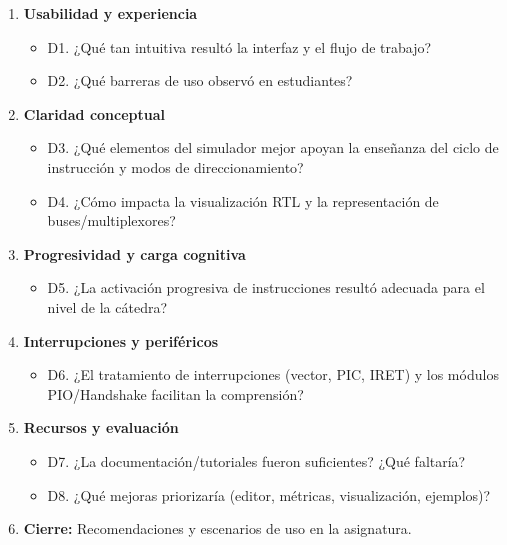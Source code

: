 \documentclass[12pt,oneside]{templates/unerthesis}
\providecommand{\tightlist}{%
  \setlength{\itemsep}{0pt}\setlength{\parskip}{0pt}}
\begin{document}
\begin{enumerate}
\def\labelenumi{\arabic{enumi}.}
\tightlist
\item
  \textbf{Usabilidad y experiencia}

  \begin{itemize}
  \tightlist
  \item
    D1. ¿Qué tan intuitiva resultó la interfaz y el flujo de trabajo?
  \item
    D2. ¿Qué barreras de uso observó en estudiantes?
  \end{itemize}
\item
  \textbf{Claridad conceptual}

  \begin{itemize}
  \tightlist
  \item
    D3. ¿Qué elementos del simulador mejor apoyan la enseñanza del ciclo de instrucción y modos de direccionamiento?
  \item
    D4. ¿Cómo impacta la visualización RTL y la representación de buses/multiplexores?
  \end{itemize}
\item
  \textbf{Progresividad y carga cognitiva}

  \begin{itemize}
  \tightlist
  \item
    D5. ¿La activación progresiva de instrucciones resultó adecuada para el nivel de la cátedra?
  \end{itemize}
\item
  \textbf{Interrupciones y periféricos}

  \begin{itemize}
  \tightlist
  \item
    D6. ¿El tratamiento de interrupciones (vector, PIC, IRET) y los módulos PIO/Handshake facilitan la comprensión?
  \end{itemize}
\item
  \textbf{Recursos y evaluación}

  \begin{itemize}
  \tightlist
  \item
    D7. ¿La documentación/tutoriales fueron suficientes? ¿Qué faltaría?
  \item
    D8. ¿Qué mejoras priorizaría (editor, métricas, visualización, ejemplos)?
  \end{itemize}
\item
  \textbf{Cierre:} Recomendaciones y escenarios de uso en la asignatura.
\end{enumerate}
\end{document}
